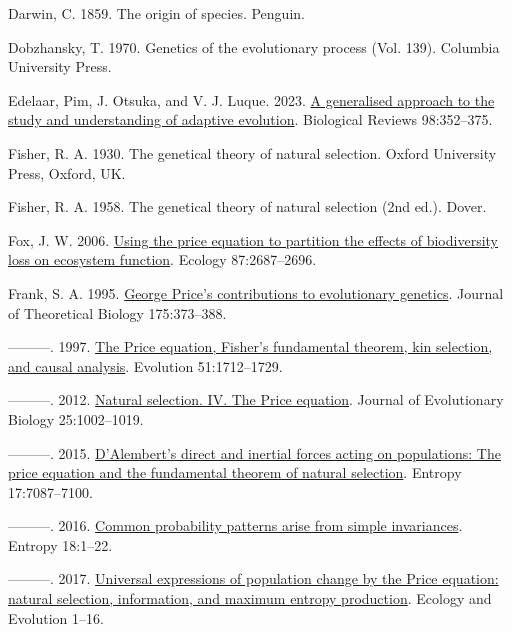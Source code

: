 \documentclass[
]{article}
\newlength{\cslhangindent}
\newenvironment{CSLReferences}[2] %
 {\begin{list}{}{%
  \setlength{\itemindent}{0pt}
  \setlength{\leftmargin}{0pt}
  \setlength{\parsep}{0pt}
  \ifodd #1
   \setlength{\leftmargin}{\cslhangindent}
   \setlength{\itemindent}{-1\cslhangindent}
  \fi
  \setlength{\itemsep}{#2\baselineskip}}}
 {\end{list}}
\begin{document}
\begin{CSLReferences}{0}{0}
Darwin, C. 1859. The origin of species. Penguin.

Dobzhansky, T. 1970. Genetics of the evolutionary process (Vol. 139).
Columbia University Press.

Edelaar, Pim, J. Otsuka, and V. J. Luque. 2023.
\href{https://doi.org/10.1111/brv.12910}{{A generalised approach to the
study and understanding of adaptive evolution}}. Biological Reviews
98:352--375.

Fisher, R. A. 1930. The genetical theory of natural selection. Oxford
University Press, Oxford, UK.

Fisher, R. A. 1958. The genetical theory of natural selection (2nd ed.).
Dover.

Fox, J. W. 2006.
\href{https://doi.org/10.1890/0012-9658(2006)87\%5B2687:utpetp\%5D2.0.co;2}{{Using
the price equation to partition the effects of biodiversity loss on
ecosystem function}}. Ecology 87:2687--2696.

Frank, S. A. 1995. \href{https://doi.org/10.1006/jtbi.1995.0148}{{George
Price's contributions to evolutionary genetics}}. Journal of Theoretical
Biology 175:373--388.

---------. 1997.
\href{https://doi.org/10.1111/j.1558-5646.1997.tb05096.x}{{The Price
equation, Fisher's fundamental theorem, kin selection, and causal
analysis}}. Evolution 51:1712--1729.

---------. 2012.
\href{https://doi.org/10.1111/j.1420-9101.2012.02498.x}{{Natural
selection. IV. The Price equation}}. Journal of Evolutionary Biology
25:1002--1019.

---------. 2015. \href{https://doi.org/10.3390/e17107087}{{D'Alembert's
direct and inertial forces acting on populations: The price equation and
the fundamental theorem of natural selection}}. Entropy 17:7087--7100.

---------. 2016. \href{https://doi.org/10.3390/e18050192}{{Common
probability patterns arise from simple invariances}}. Entropy 18:1--22.

---------. 2017. \href{https://doi.org/10.1002/ece3.2922}{{Universal
expressions of population change by the Price equation: natural
selection, information, and maximum entropy production}}. Ecology and
Evolution 1--16.


\end{CSLReferences}
\end{document}
